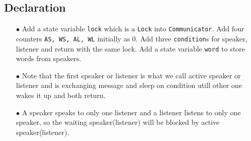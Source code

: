 \documentclass{article}
\begin{document}
\subsection{Declaration}
\begin{enumerate}
	\item[$\bullet$] Add a state variable \texttt{lock} which is a \texttt{Lock} into \texttt{Communicator}. 
		Add four counters \texttt{AS, WS, AL, WL} initially as 0. Add three \texttt{condition}s for speaker, listener and return with the same lock.
		Add a state variable \texttt{word} to store words from speakers.
	\item[$\bullet$] Note that the first speaker or listener is what we call active speaker
		or listener and is exchanging message and sleep on condition utill other one wakes it up and both return.
	\item[$\bullet$] A speaker speaks to only one listener and a listener listens to only one speaker, so the waiting speaker(listener) will be 
		blocked by active speaker(listener).
\end{enumerate}
\end{document}
